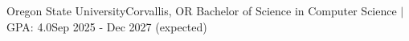 \resumeSubHeadingListStart
  \resumeSubheading
    {Oregon State University}{Corvallis, OR}
    {Bachelor of Science in Computer Science $|$ GPA: 4.0}{Sep 2025 - Dec 2027 (expected)}
    \vspace{-1pt}
    \resumeItemListStart
    \resumeItemListEnd
    \vspace{2pt}
\resumeSubHeadingListEnd
